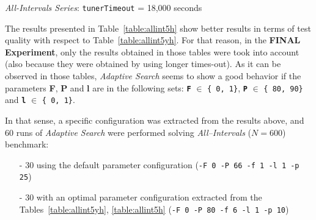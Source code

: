 \begin{table}[h] 	
\centering 
\renewcommand{\arraystretch}{1.2}
\caption{{\it All-Intervals Series}: \texttt{tunerTimeout} = 18,000 seconds}\label{table:allint5h}
\end{table}

The results presented in Table~\ref{table:allint5h} show better results in terms of test quality with respect to Table~\ref{table:allint5yh}. For that reason, in the \textbf{FINAL Experiment}, only the results obtained in those tables were took into account (also because they were obtained by using longer times-out). As it can be observed in those tables, {\it Adaptive Search} seems to show a good behavior if the parameters {\bf F}, {\bf P} and {\bf l} are in the following sets: \texttt{\bf F} $\in$ \texttt{\{ 0, 1\}}, \texttt{\bf P} $\in$ \texttt{\{ 80, 90\}} and \texttt{\bf l} $\in$ \texttt{\{ 0, 1\}}.

In that sense, a specific configuration was extracted from the results above, and 60 runs of {\it Adaptive Search} were performed solving {\it All--Intervals} ($N = 600$) benchmark:
\begin{itemize}
	\item[-] 30 using the default parameter configuration (\texttt{-F 0 -P 66 -f 1 -l 1 -p 25})
	\item[-] 30 with an optimal parameter configuration extracted from the Tables~\ref{table:allint5yh}, \ref{table:allint5h} (\texttt{-F 0 -P 80 -f 6 -l 1 -p 10})
\end{itemize}


